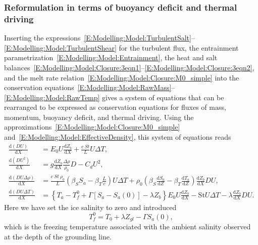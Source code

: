 \documentclass[openacc]{rsproca_new}%
\newcommand{\dd}[2]{\frac{\mathrm{d} #1}{\mathrm{d} #2}}
\begin{document}
\subsubsection{Reformulation in terms of buoyancy deficit and thermal driving}
Inserting the expressions~\eqref{E:Modelling:Model:TurbulentSalt}--\eqref{E:Modelling:Model:TurbulentShear} for the turbulent flux, the entrainment parametrization~\eqref{E:Modelling:Model:Entrainment}, the heat and salt balances~\eqref{E:Modelling:Model:Closure:3eqn1}--\eqref{E:Modelling:Model:Closure:3eqn2}, and the melt rate relation~\eqref{E:Modelling:Model:Closure:M0_simple} into the conservation equations~\eqref{E:Modelling:Model:RawMass}--\eqref{E:Modelling:Model:RawTemp} gives a system of equations that can be rearranged to be expressed as conservation equations for fluxes of mass, momentum, buoyancy deficit, and thermal driving. Using the approximations~\eqref{E:Modelling:Model:Closure:M0_simple} and~\eqref{E:Modelling:Model:EffectiveDensity}, this system of equations reads
\begin{align}
\dd{(DU)}{X} &= E_0 U \dd{Z_b}{X}+ \frac{c~\textit{St}}{L}U\Delta T,\label{E:Modelling:Model:Mass}\\
\dd{(DU^2)}{X} &= g \dd{Z_b}{X} \frac{\Delta \rho }{\rho_0} D - C_d U^2, \label{E:Modelling:Model:Mom}\\
\dd{(DU\Delta \rho)}{X} &= \frac{c~\textit{St}~\rho_0}{L}\left(\beta_S S_a - \beta_T \frac{L}{c}\right) U\Delta T + \rho_0\left(\beta_S \dd{S_a}{Z}-\beta_T \dd{T_a}{Z}\right) \dd{Z_b}{X} DU, \label{E:Modelling:Model:Buoyancy}\\
\dd{(DU\Delta T)}{X} &= \left\{T_a - T_{f}^0 + \Gamma \left[S_a - S_a(0)\right] - \lambda Z_b\right\}E_0 U \dd{Z_b}{X} - \mathrm{St}U \Delta T - \lambda \dd{Z_b}{X} DU.
\label{E:Modelling:Model:Thermal}
\end{align}
Here we have set the ice salinity to zero and introduced
\begin{equation}
T_{f}^0 = T_0 + \lambda Z_{gl} - \Gamma S_a(0),
\end{equation}
which is the freezing temperature associated with the ambient salinity observed at the depth of the grounding line.
\end{document}
